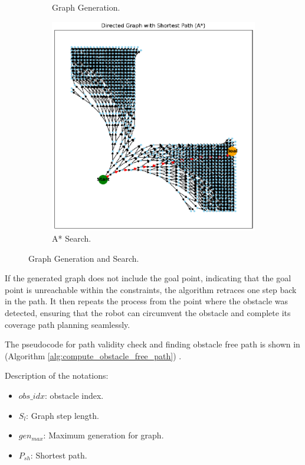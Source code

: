 \begin{figure}[H]
\begin{subfigure}{0.3\textwidth}
        \caption{Graph Generation.}
    \end{subfigure}
    \hfill
    \begin{subfigure}{0.3\textwidth}
        \centering
        \includegraphics[width=\textwidth]{Images/Algorithm_obs/graph/Graph_explainiation_images/path.png}
        \caption{A* Search.}
    \end{subfigure}
    \caption{Graph Generation and Search.\label{fig:graph_generation}} 
\end{figure}

If the generated graph does not include the goal point, indicating that the goal point is unreachable within the constraints, the algorithm retraces one step back in the path. It then repeats the process from the point where the obstacle was detected, ensuring that the robot can circumvent the obstacle and complete its coverage path planning seamlessly.

\vspace{3mm}  

The pseudocode for path validity check and finding obstacle free path is shown in (Algorithm \autoref{alg:compute_obstacle_free_path}) .

Description of the notations:
\begin{multicols}{2}
\begin{itemize}[noitemsep,topsep=0pt]
    \item $obs\_idx$: obstacle index.
    \item $S_l$: Graph step length.
    \item $gen_{max}$: Maximum generation for graph.
    \item $P_{sh}$: Shortest path.
\end{itemize}
\end{multicols}

